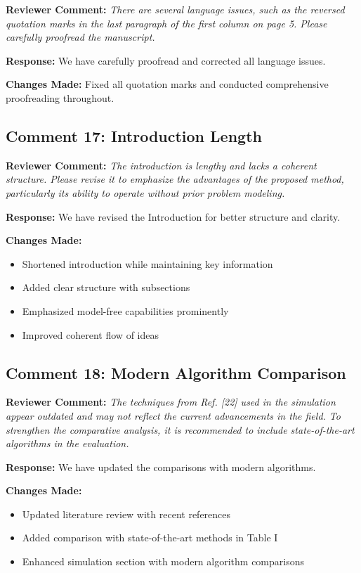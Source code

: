\documentclass[11pt]{article}
\newcommand{\reviewercomment}[1]{\textbf{Reviewer Comment:} \textit{#1}}
\newcommand{\response}[1]{\textbf{Response:} #1}
\newcommand{\changes}[1]{\textbf{Changes Made:} #1}
\begin{document}
\reviewercomment{There are several language issues, such as the reversed quotation marks in the last paragraph of the first column on page 5. Please carefully proofread the manuscript.}

\response{We have carefully proofread and corrected all language issues.}

\changes{Fixed all quotation marks and conducted comprehensive proofreading throughout.}

\subsection*{Comment 17: Introduction Length}

\reviewercomment{The introduction is lengthy and lacks a coherent structure. Please revise it to emphasize the advantages of the proposed method, particularly its ability to operate without prior problem modeling.}

\response{We have revised the Introduction for better structure and clarity.}

\changes{
\begin{itemize}
\item Shortened introduction while maintaining key information
\item Added clear structure with subsections
\item Emphasized model-free capabilities prominently
\item Improved coherent flow of ideas
\end{itemize}
}

\subsection*{Comment 18: Modern Algorithm Comparison}

\reviewercomment{The techniques from Ref. [22] used in the simulation appear outdated and may not reflect the current advancements in the field. To strengthen the comparative analysis, it is recommended to include state-of-the-art algorithms in the evaluation.}

\response{We have updated the comparisons with modern algorithms.}

\changes{
\begin{itemize}
\item Updated literature review with recent references
\item Added comparison with state-of-the-art methods in Table I
\item Enhanced simulation section with modern algorithm comparisons
\end{itemize}
}
\end{document}
